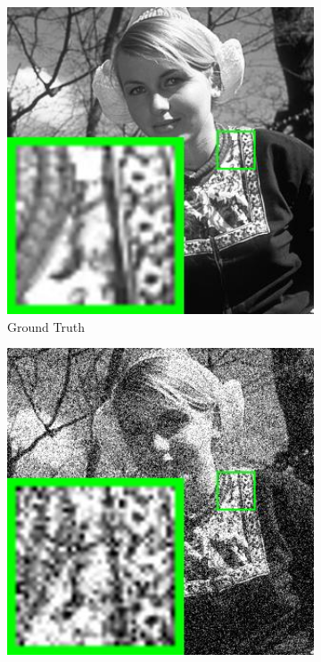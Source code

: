 \begin{figure}
    \centering
    \begin{subfigure}[t]{0.24\textwidth}
        \centering
        \includegraphics[width=1\textwidth]{images/pgpd/200img/br_258089.jpg}
	   \caption{Ground Truth}
    \end{subfigure}
    \hfill
    \begin{subfigure}[t]{0.24\textwidth}
        \centering
        \includegraphics[width=1\textwidth]{images/pgpd/200img/br_50_258089.jpg}

\end{subfigure}
\end{figure}

